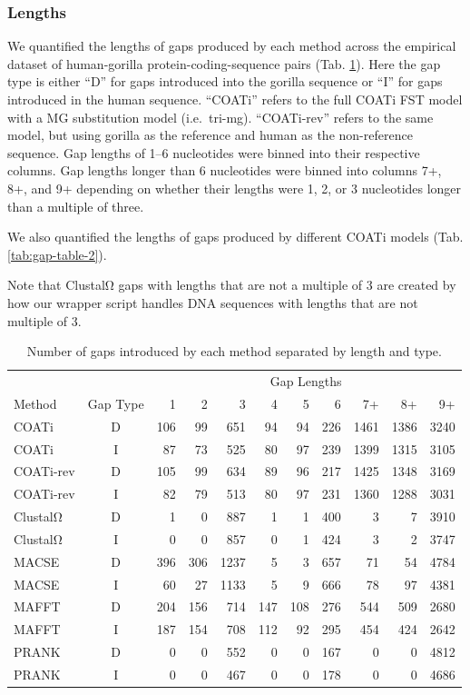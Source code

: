 \documentclass[
]{article}
\begin{document}
\hypertarget{lengths}{%
\subsubsection{Lengths}\label{lengths}}

We quantified the lengths of gaps produced by each method across the empirical dataset of human-gorilla protein-coding-sequence pairs (Tab. \ref{tab:gap-table-1}). Here the gap type is either ``D'' for gaps introduced into the gorilla sequence or ``I'' for gaps introduced in the human sequence. ``COATi'' refers to the full COATi FST model with a MG substitution model (i.e.~tri-mg). ``COATi-rev'' refers to the same model, but using gorilla as the reference and human as the non-reference sequence. Gap lengths of 1--6 nucleotides were binned into their respective columns. Gap lengths longer than 6 nucleotides were binned into columns 7+, 8+, and 9+ depending on whether their lengths were 1, 2, or 3 nucleotides longer than a multiple of three.

We also quantified the lengths of gaps produced by different COATi models (Tab. \ref{tab:gap-table-2}).

Note that ClustalΩ gaps with lengths that are not a multiple of 3 are created by how our wrapper script handles DNA sequences with lengths that are not multiple of 3.

\begin{table}[H]

\caption{\label{tab:gap-table-1}Number of gaps introduced by each method separated by length and type.}
\centering
\begin{tabular}[t]{lcrrrrrrrrr}
\toprule
\multicolumn{2}{c}{ } & \multicolumn{9}{c}{Gap Lengths} \\
\cmidrule(l{3pt}r{3pt}){3-11}
Method & Gap Type & 1 & 2 & 3 & 4 & 5 & 6 & 7+ & 8+ & 9+\\
\midrule
COATi & D & 106 & 99 & 651 & 94 & 94 & 226 & 1461 & 1386 & 3240\\
COATi & I & 87 & 73 & 525 & 80 & 97 & 239 & 1399 & 1315 & 3105\\
\addlinespace
COATi-rev & D & 105 & 99 & 634 & 89 & 96 & 217 & 1425 & 1348 & 3169\\
COATi-rev & I & 82 & 79 & 513 & 80 & 97 & 231 & 1360 & 1288 & 3031\\
\addlinespace
ClustalΩ & D & 1 & 0 & 887 & 1 & 1 & 400 & 3 & 7 & 3910\\
ClustalΩ & I & 0 & 0 & 857 & 0 & 1 & 424 & 3 & 2 & 3747\\
\addlinespace
MACSE & D & 396 & 306 & 1237 & 5 & 3 & 657 & 71 & 54 & 4784\\
MACSE & I & 60 & 27 & 1133 & 5 & 9 & 666 & 78 & 97 & 4381\\
\addlinespace
MAFFT & D & 204 & 156 & 714 & 147 & 108 & 276 & 544 & 509 & 2680\\
MAFFT & I & 187 & 154 & 708 & 112 & 92 & 295 & 454 & 424 & 2642\\
\addlinespace
PRANK & D & 0 & 0 & 552 & 0 & 0 & 167 & 0 & 0 & 4812\\
PRANK & I & 0 & 0 & 467 & 0 & 0 & 178 & 0 & 0 & 4686\\
\bottomrule
\end{tabular}
\end{table}
\end{document}
